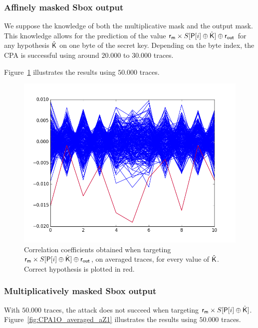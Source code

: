 \subsubsection{Affinely masked Sbox output}
We suppose the knowledge of both the multiplicative mask and the output mask. This knowledge allows for the prediction of the value $\mathsf{r_m} \times S[\mathsf{P}[i]\oplus \hat{\mathsf{K}}] \oplus \mathsf{r_{out}}$ for any hypothesis $\hat{\mathsf{K}}$ on one byte of the secret key.
Depending on the byte index, the CPA is successful using around $20.000$ to $30.000$ traces.

Figure~\ref{fig:CPA1O_averaged_aZb1} illustrates the results using $50.000$ traces.
\begin{figure}[H]
	\centering 
	\includegraphics[scale=0.4]{figures/CPA1O_averaged_aZb1.png}
	\caption{Correlation coefficients obtained when targeting $\mathsf{r_m} \times S[\mathsf{P}[i]\oplus \hat{\mathsf{K}}] \oplus \mathsf{r_{out}}$, on averaged traces, for every value of $\hat{\mathsf{K}}$. Correct hypothesis is plotted  in red.}
	\label{fig:CPA1O_averaged_aZb1}
\end{figure}

\subsubsection{Multiplicatively masked Sbox output}
With $50.000$ traces, the attack does not succeed when targeting $\mathsf{r_m} \times S[\mathsf{P}[i]\oplus \hat{\mathsf{K}}]$.
Figure~\ref{fig:CPA1O_averaged_aZ1} illustrates the results using $50.000$ traces.

